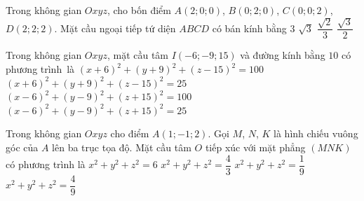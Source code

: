 \begin{ex}%
	Trong không gian $Oxyz$, cho bốn điểm $A\left(2;0;0\right)$, $B\left(0;2;0\right)$, $C\left(0;0;2\right)$, $D\left(2;2;2\right)$. Mặt cầu ngoại tiếp tứ diện  $ABCD$ có bán kính bằng
	\choice 
		{$ 3 $} 
		{\True  $\sqrt 3 $}
		 {$\dfrac{\sqrt 2}{3}$}
		{$\dfrac{\sqrt 3}{2}$} 
\end{ex}

\begin{ex}%
	Trong không gian  $Oxyz$, mặt cầu tâm $I(-6;-9; 15)$ và đường kính bằng $10$ có phương trình~là
	\choice 
		 {$(x+6)^2+(y+9)^2+(z-15)^2=100$}
		{\True $(x+6)^2+(y+9)^2+(z-15)^2=25$} 
		{$(x-6)^2+(y-9)^2+(z+15)^2=100$} 
		{$(x-6)^2+(y-9)^2+(z+15)^2=25$} 
\end{ex}

\begin{ex}%
	Trong không gian $Oxyz$ cho điểm $A(1;-1; 2)$. Gọi $M$, $N$, $K$ là hình chiếu vuông  góc của $A$ lên ba trục tọa độ. Mặt cầu tâm $O$ tiếp xúc với mặt phẳng $(MNK)$ có phương trình là
	\choice 
		 {$x^2+y^2+z^2=6$}
		 {$x^2+y^2+z^2=\dfrac{4}{3}$}
		 {$x^2+y^2+z^2=\dfrac{1}{9}$}
		 {\True $x^2+y^2+z^2=\dfrac{4}{9}$}
\end{ex}

